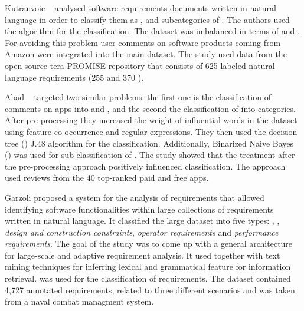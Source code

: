 Kutranvoic \etal~\cite {Kurtanovic:2017} analysed software requirements
documents written in natural language in order to classify them as \FRs, \NFRs
and subcategories of \NFRs. The authors used the \SVM algorithm for the
classification. The dataset was imbalanced in terms of \FRs and
\NFRs. For avoiding this problem user comments on software products coming
from Amazon were integrated into the main dataset. The study used data from
the open source tera PROMISE repository that consists of 625 labeled natural
language requirements (255 \FR [40.8\%] and 370 \NFR[59.2\%]).

Abad \etal~\cite{Abad:2017} targeted two similar problems: the first one is the
classification of comments on apps into \FRs and \NFRs, and the second the
classification of \NFRs into categories.
After pre-processing they increased the weight of influential words in the
dataset using feature co-occurrence and regular expressions. They then used the
decision tree (\DT) J.48 algorithm for the classification. Additionally,
Binarized Naive Bayes (\BNB) was used for sub-classification of \NFRs. The study
showed that the treatment after the pre-processing approach positively
influenced classification. The approach used reviews from the 40 top-ranked paid
and free apps.

Garzoli \cite {Garzoli:2013} proposed a system for the analysis of requirements
that allowed identifying software functionalities within large collections of
requirements written in natural language. It classified the large dataset into
five types: \FRs, \NFRs, \emph{design and construction constraints},
\emph{operator requirements} and \emph{performance requirements}.  The goal of
the study was to come up with a general architecture for large-scale and
adaptive requirement analysis. It used \BOW together with text mining techniques
for inferring lexical and grammatical feature for information retrieval. \SVM
was used for the classification of requirements. The dataset contained 4,727
annotated requirements, related to three different scenarios and was taken
from a naval combat managment system.

